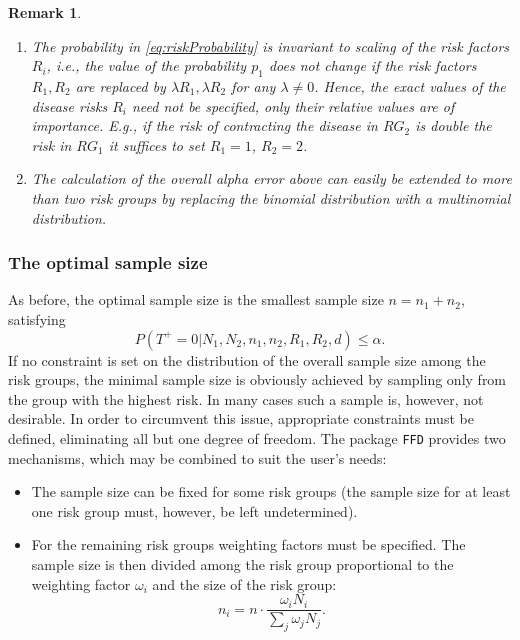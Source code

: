 \documentclass[nojss]{jss}
\newtheorem{remark}{Remark}[section]
\begin{document}
\begin{remark}
\begin{enumerate}
\item The probability in \eqref{eq:riskProbability} is invariant to scaling of the risk factors $R_i$, i.e., the value of the probability $p_1$ does not change if the risk factors $R_1,R_2$ are replaced by $\lambda R_1, \lambda R_2$ for any $\lambda \neq 0$. Hence, the exact values of the disease risks $R_i$ need not be specified, only their relative values are of importance. E.g., if the risk of contracting the disease in $RG_2$ is double the risk in $RG_1$ it suffices to set $R_1 = 1$, $R_2 = 2$.
\item The calculation of the overall alpha error above can easily be extended to more than two risk groups by replacing the binomial distribution with a multinomial distribution.
\end{enumerate}
\end{remark}


\subsubsection{The optimal sample size}

As before, the optimal sample size is the smallest sample size $n = n_1 + n_2$, satisfying
$$ P(T^+=0 | N_1, N_2, n_1, n_2, R_1, R_2, d)\leq \alpha.$$
If no constraint is set on the distribution of the overall sample size among the risk groups, the minimal sample size is obviously  achieved by sampling only from the group with the highest risk. In many cases such a sample is, however, not desirable. In order to circumvent this issue, appropriate constraints must be defined, eliminating all but one degree of freedom. The package \texttt{FFD} provides two mechanisms, which may be combined to suit the user's needs:
%
\begin{itemize}
%
\item The sample size can be fixed for some risk groups (the sample size for at least one risk group must, however, be left undetermined).
\item For the remaining risk groups weighting factors must be specified. The sample size is then divided among the risk group proportional to the weighting factor $\omega_i$ and the size of the risk group:
    $$n_i = n\cdot \frac{\omega_i N_i}{\sum_j \omega_j N_j}.$$
%
\end{itemize}
\end{document}
